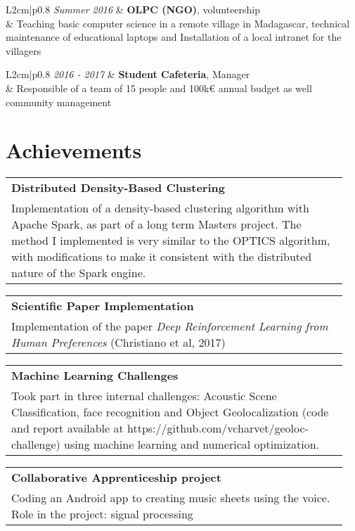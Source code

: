 \documentclass[a4paper,10.5pt]{article}
\begin{document}
	\begin{tabular}{L{2cm}|p{0.8\linewidth}}
		\textit{Summer 2016} & \textbf{OLPC (NGO)}, volunteership \\
		& Teaching basic computer science in a remote village in Madagascar, technical maintenance of educational laptops and Installation of a local intranet for the villagers
	\end{tabular}
	
	\begin{tabular}{L{2cm}|p{0.8\linewidth}}
		\textit{2016 - 2017} & \textbf{Student Cafeteria}, Manager \\
		& Responsible of a team of 15 people and 100k€ annual budget as well community management
	\end{tabular}
			
	
	\section*{Achievements}
	\begin{tabular}{|p{0.95\linewidth} }
		\textbf{Distributed Density-Based Clustering} \\
		Implementation of a density-based clustering algorithm with Apache Spark, as part of a long term Masters project. The method I implemented is very similar to the OPTICS algorithm, with modifications to make it consistent with the distributed nature of the Spark engine. 
	\end{tabular}
	
	\begin{tabular}{|p{0.95\linewidth}}
		\textbf{Scientific Paper Implementation}\\
		Implementation of the paper \textit{Deep Reinforcement Learning from Human Preferences} (Christiano et al, 2017)
	\end{tabular}


	\begin{tabular}{|p{0.95\linewidth} }
		\textbf{Machine Learning Challenges} \\
		Took part in three internal challenges: Acoustic Scene Classification, face recognition and Object Geolocalization (code and report available at https://github.com/vcharvet/geoloc-challenge) using machine learning and numerical optimization.
	\end{tabular}
	
	\begin{tabular}{|p{0.95\linewidth} }
		\textbf{Collaborative Apprenticeship project} \\
		Coding an Android app to creating music sheets using the voice.
		Role in the project: signal processing 
	\end{tabular}
	
\end{document}

